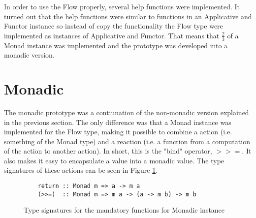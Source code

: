 In order to use the Flow properly, several help functions were implemented. It turned out that the help functions were similar to functions in an Applicative and Functor instance so instead of copy the functionality the Flow type were implemented as instances of Applicative and Functor. That means that \(\frac{2}{3}\) of a Monad instance was implemented and the prototype was developed into a monadic version.
\section{Monadic}
The monadic prototype was a contiunation of the non-monadic version explained in the previous section. The only difference was that a Monad instance was implemented for the Flow type, making it possible to combine a action (i.e. something of the Monad type) and a reaction (i.e. a function from a computation of the action to another action). In short, this is the "bind" operator, \(>>=\). It also makes it easy to encapsulate a value into a monadic value. The type signatures of these actions can be seen in Figure \ref{fig:monadic_actions}. 
\begin{figure}[h]
  \lstset{language=Haskell}
  \begin{lstlisting}
    return :: Monad m => a -> m a
    (>>=)  :: Monad m => m a -> (a -> m b) -> m b
  \end{lstlisting}
  \caption{Type signatures for the mandatory functions for Monadic instance}
  \label{fig:monadic_actions}
\end{figure}
